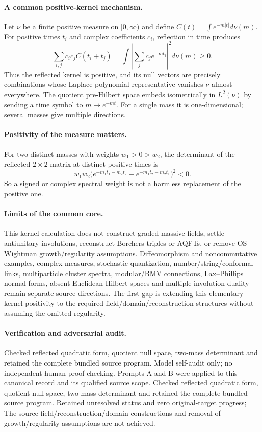\documentclass[11pt]{article}
\begin{document}
\paragraph{A common positive-kernel mechanism.} Let $\nu$ be a finite positive measure on $[0,\infty)$ and define $C(t)=\int e^{-m|t|}d\nu(m)$. For positive times $t_i$ and complex coefficients $c_i$, reflection in time produces
\[
 \sum_{i,j}\overline c_i c_j C(t_i+t_j)
 =\int\left|\sum_jc_je^{-mt_j}\right|^2d\nu(m)\geq0.
\]
Thus the reflected kernel is positive, and its null vectors are precisely combinations whose Laplace-polynomial representative vanishes $\nu$-almost everywhere. The quotient pre-Hilbert space embeds isometrically in $L^2(\nu)$ by sending a time symbol to $m\mapsto e^{-mt}$. For a single mass it is one-dimensional; several masses give multiple directions.

\paragraph{Positivity of the measure matters.} For two distinct masses with weights $w_1>0>w_2$, the determinant of the reflected $2\times2$ matrix at distinct positive times is
\[
 w_1w_2\bigl(e^{-m_1t_1-m_2t_2}-e^{-m_1t_2-m_2t_1}\bigr)^2<0.
\]
So a signed or complex spectral weight is not a harmless replacement of the positive one.

\paragraph{Limits of the common core.} This kernel calculation does not construct graded massive fields, settle antiunitary involutions, reconstruct Borchers triples or AQFTs, or remove OS--Wightman growth/regularity assumptions. Diffeomorphism and noncommutative examples, complex measures, stochastic quantization, number/string/conformal links, multiparticle cluster spectra, modular/BMV connections, Lax--Phillips normal forms, absent Euclidean Hilbert spaces and multiple-involution duality remain separate source directions. The first gap is extending this elementary kernel positivity to the required field/domain/reconstruction structures without assuming the omitted regularity.

\paragraph{Verification and adversarial audit.}
Checked reflected quadratic form, quotient null space, two-mass determinant and retained the complete bundled source program. Model self-audit only; no independent human proof checking. Prompts A and B were applied to this canonical record and its qualified source scope. Checked reflected quadratic form, quotient null space, two-mass determinant and retained the complete bundled source program. Retained unresolved status and zero original-target progress; The source field/reconstruction/domain constructions and removal of growth/regularity assumptions are not achieved.
\end{document}
